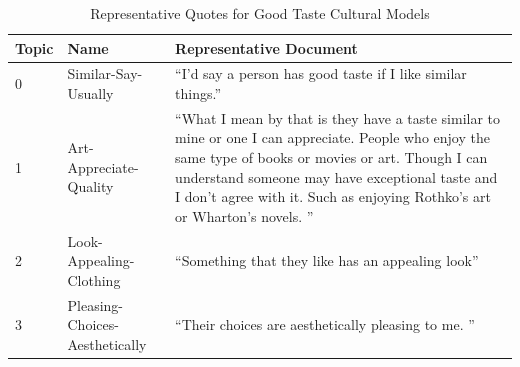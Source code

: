 \begin{table}[htpb]
\centering
\footnotesize
\begin{tabular}{lp{3.5cm}p{10cm}}
\toprule
Topic & Name & Representative Document \\
\midrule
0 & Similar-Say-Usually & ``I’d say a person has good taste if I like similar things.'' \\
1 & Art-Appreciate-Quality & ``What I mean by that is they have a taste similar to mine or one I can appreciate. People who enjoy the same type of books or movies or art.  Though I can understand someone may have exceptional taste and I don't agree with it.  Such as enjoying Rothko's art or Wharton's novels.  '' \\
2 & Look-Appealing-Clothing & ``Something that they like has an appealing look'' \\
3 & Pleasing-Choices-Aesthetically & ``Their choices are aesthetically pleasing to me. '' \\
\bottomrule
\end{tabular}
\caption{Representative Quotes for Good Taste Cultural Models}
\label{tab:good_taste_rep_docs}
\end{table}
